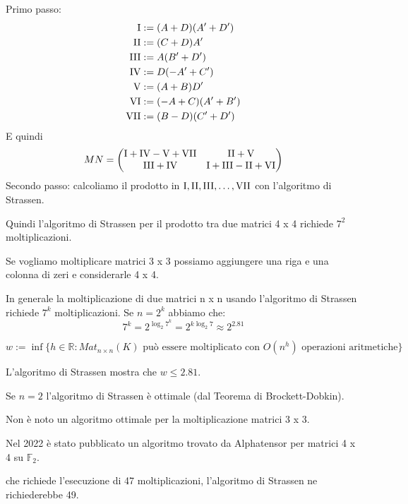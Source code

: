 \documentclass[../main.tex]{subfiles}
\begin{document}
Primo passo:
\begin{align*}
    \RomanNumber 1 & := (A + D)(A' + D')  \\
    \RomanNumber 2 & := (C + D) A'        \\
    \RomanNumber 3 & := A(B' + D')        \\
    \RomanNumber 4 & := D(-A' + C')       \\
    \RomanNumber 5 & := (A + B)D'         \\
    \RomanNumber 6 & := (-A + C)(A' + B') \\
    \RomanNumber 7 & := (B - D)(C' + D')
\end{align*}
E quindi
\begin{equation*}
    MN = \begin{pmatrix}
        \RomanNumber 1 + \RomanNumber 4 - \RomanNumber 5 + \RomanNumber 7 & \RomanNumber 2 + \RomanNumber 5                                   \\
        \RomanNumber 3 + \RomanNumber 4                                   & \RomanNumber 1 + \RomanNumber 3 - \RomanNumber 2 + \RomanNumber 6
    \end{pmatrix}
\end{equation*}
Secondo passo: calcoliamo il prodotto in $\RomanNumber 1, \RomanNumber 2, \RomanNumber 3, \ldots , \RomanNumber 7$ con l'algoritmo di Strassen.

Quindi l'algoritmo di Strassen per il prodotto tra due matrici 4 x 4 richiede $7^2$ moltiplicazioni.

Se vogliamo moltiplicare matrici 3 x 3 possiamo aggiungere una riga e una colonna di zeri e considerarle 4 x 4.

In generale la moltiplicazione di due matrici n x n usando l'algoritmo di Strassen richiede $7^k$ moltiplicazioni. Se $n = 2^k$ abbiamo che:
\begin{equation*}
    7^k = 2^{\log_2 7^k}=2^{k \log_2 7} \approx 2^{2.81}
\end{equation*}

\begin{definition}
    \begin{equation*}
        w := \inf \{ h \in \mathbb{R} : Mat_{n \times n}(K) \text{ può essere moltiplicato con } O(n^h) \text{ operazioni aritmetiche} \}
    \end{equation*}
\end{definition}

L'algoritmo di Strassen mostra che $w \leq 2.81$.

Se $n = 2$ l'algoritmo di Strassen è ottimale (dal Teorema di Brockett-Dobkin).

Non è noto un algoritmo ottimale per la moltiplicazione matrici 3 x 3.

Nel 2022 è stato pubblicato un algoritmo trovato da Alphatensor per matrici 4 x 4 su $\mathbb{F}_2$.

che richiede l'esecuzione di 47 moltiplicazioni, l'algoritmo di Strassen ne richiederebbe 49.
\end{document}
